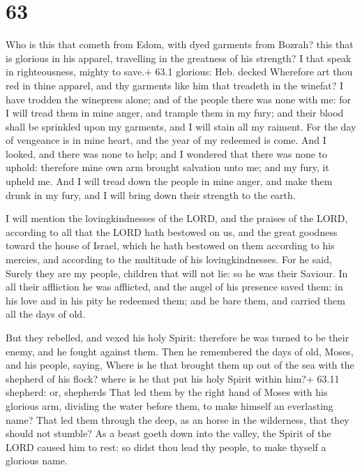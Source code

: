 \hypertarget{section-62}{%
\section{63}\label{section-62}}

 Who is this that cometh from Edom, with dyed garments from
Bozrah? this that is glorious in his apparel, travelling in the
greatness of his strength? I that speak in righteousness, mighty to
save.+ 63.1 glorious: Heb. decked  Wherefore art thou red in
thine apparel, and thy garments like him that treadeth in the winefat?
 I have trodden the winepress alone; and of the people there
was none with me: for I will tread them in mine anger, and trample them
in my fury; and their blood shall be sprinkled upon my garments, and I
will stain all my raiment.  For the day of vengeance is in
mine heart, and the year of my redeemed is come.  And I
looked, and there was none to help; and I wondered that there was none
to uphold: therefore mine own arm brought salvation unto me; and my
fury, it upheld me.  And I will tread down the people in
mine anger, and make them drunk in my fury, and I will bring down their
strength to the earth.

 I will mention the lovingkindnesses of the LORD, and the
praises of the LORD, according to all that the LORD hath bestowed on us,
and the great goodness toward the house of Israel, which he hath
bestowed on them according to his mercies, and according to the
multitude of his lovingkindnesses.  For he said, Surely they
are my people, children that will not lie: so he was their Saviour.
 In all their affliction he was afflicted, and the angel of
his presence saved them: in his love and in his pity he redeemed them;
and he bare them, and carried them all the days of old.

 But they rebelled, and vexed his holy Spirit: therefore
he was turned to be their enemy, and he fought against them.
 Then he remembered the days of old, Moses, and his people,
saying, Where is he that brought them up out of the sea with the
shepherd of his flock? where is he that put his holy Spirit within him?+
63.11 shepherd: or, shepherds  That led them by the right
hand of Moses with his glorious arm, dividing the water before them, to
make himself an everlasting name?  That led them through
the deep, as an horse in the wilderness, that they should not stumble?
 As a beast goeth down into the valley, the Spirit of the
LORD caused him to rest: so didst thou lead thy people, to make thyself
a glorious name.

